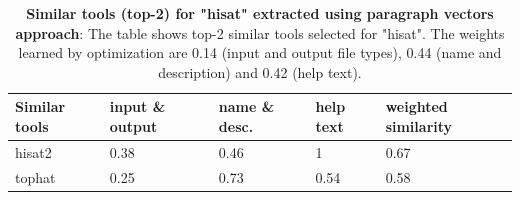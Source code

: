 \clearpage
\begin{table}[ht]
\begin{center}
    \begin{tabular}{|l|l|l|l|l|}
        \hline
        Similar tools & input \& output & name \& desc. & help text & weighted similarity \\ \hline
        hisat2 & 0.38 & 0.46 & 1 & 0.67 \\ \hline
        tophat & 0.25 & 0.73 & 0.54 & 0.58 \\ \hline
    \end{tabular}
    \end{center}
    \caption[Similar tools (top-2) for "hisat" extracted using paragraph vectors approach]{\textbf{Similar tools (top-2) for "hisat" extracted using paragraph vectors approach}: The table shows top-2 similar tools selected for "hisat". The weights learned by optimization are 0.14 (input and output file types), 0.44 (name and description) and 0.42 (help text).}
    \label{tab:accuracy}
\end{table}